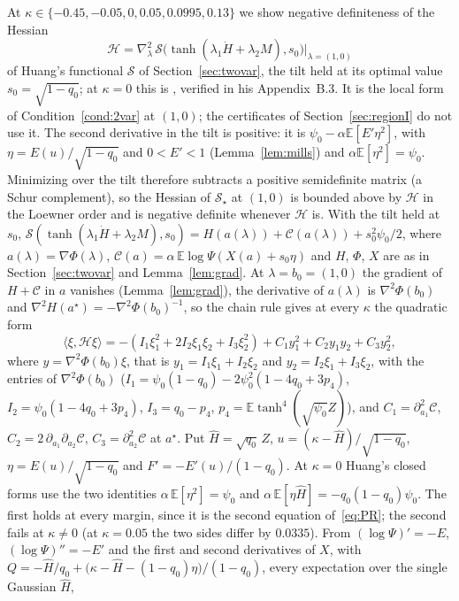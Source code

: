 \documentclass[11pt]{article}
\theoremstyle{remark}
\newcommand{\E}{\mathbb{E}}
\newcommand{\sS}{\mathcal{S}}
\begin{document}
At $\kappa\in\{-0.45,-0.05,0,0.05,0.0995,0.13\}$ we show negative
definiteness of the Hessian
\[
\mathcal H=\nabla^2_\lambda\,\sS\bigl(\tanh(\lambda_1\dot H+\lambda_2M),s_0\bigr)\Bigr|_{\lambda=(1,0)}
\]
of Huang's functional $\sS$ of Section~\ref{sec:twovar}, the tilt
held at its optimal value $s_0=\sqrt{1-q_0}$; at $\kappa=0$ this is
\cite[Claim~2.6]{huang2024capacity}, verified in his Appendix~B.3.  It
is the local form of Condition~\ref{cond:2var} at $(1,0)$; the
certificates of Section~\ref{sec:regionI} do not use it.
The second derivative in the tilt is positive: it is
$\psi_0-\alpha\E[E'\eta^2]$, with $\eta=E(u)/\sqrt{1-q_0}$ and $0<E'<1$ (Lemma~\ref{lem:mills}) and
$\alpha\E[\eta^2]=\psi_0$.  Minimizing over the tilt therefore
subtracts a positive semidefinite matrix (a Schur complement), so the Hessian of $\sS_\star$ at
$(1,0)$ is bounded above by $\mathcal H$ in the Loewner order and is
negative definite whenever $\mathcal H$ is.  With the tilt held at $s_0$,
$\sS(\tanh(\lambda_1\dot H+\lambda_2M),s_0)=H(a(\lambda))+\mathcal C(a(\lambda))+s_0^2\psi_0/2$,
where $a(\lambda)=\nabla\Phi(\lambda)$, $\mathcal C(a)=\alpha\,\E\log\Psi(X(a)+s_0\eta)$ and
$H$, $\Phi$, $X$ are as in Section~\ref{sec:twovar} and Lemma~\ref{lem:grad}.  At
$\lambda=b_0=(1,0)$ the gradient of $H+\mathcal C$ in $a$ vanishes
(Lemma~\ref{lem:grad}), the derivative of $a(\lambda)$ is
$\nabla^2\Phi(b_0)$ and $\nabla^2H(a^\star)=-\nabla^2\Phi(b_0)^{-1}$, so
the chain rule gives at every $\kappa$ the quadratic form
\[
\langle \xi, \mathcal H \xi\rangle=
-(I_1\xi_1^2+2I_2\xi_1\xi_2+I_3\xi_2^2)+C_1y_1^2+C_2y_1y_2+C_3y_2^2,
\]
where $y=\nabla^2\Phi(b_0)\xi$, that is $y_1=I_1\xi_1+I_2\xi_2$ and
$y_2=I_2\xi_1+I_3\xi_2$, with the entries of $\nabla^2\Phi(b_0)$
($I_1=\psi_0(1-q_0)-2\psi_0^2(1-4q_0+3p_4)$,
$I_2=\psi_0(1-4q_0+3p_4)$, $I_3=q_0-p_4$, $p_4=\E\tanh^4(\sqrt
{\psi_0}Z)$), and $C_1=\partial_{a_1}^2\mathcal C$,
$C_2=2\,\partial_{a_1}\partial_{a_2}\mathcal C$, $C_3=\partial_{a_2}^2\mathcal C$ at
$a^\star$.  Put
$\hat H=\sqrt{q_0}\,Z$, $u=(\kappa-\hat H)/\sqrt{1-q_0}$,
$\eta=E(u)/\sqrt{1-q_0}$ and $F'=-E'(u)/(1-q_0)$.  At $\kappa=0$ Huang's closed forms
use the two identities $\alpha\,\E[\eta^2]=\psi_0$ and
$\alpha\,\E[\eta \hat H]=-q_0(1-q_0)\psi_0$.  The first holds at every
margin, since it is the second equation of~\eqref{eq:PR}; the second
fails at $\kappa\ne0$ (at $\kappa=0.05$ the two sides differ by $0.0335$).  From
$(\log\Psi)'=-E$, $(\log\Psi)''=-E'$ and the first and second
derivatives of $X$, with
$Q=-\hat H/q_0+\bigl(\kappa-\hat H-(1-q_0)\eta \bigr)/(1-q_0)$,
every expectation over the single Gaussian $\hat H$,
\end{document}
